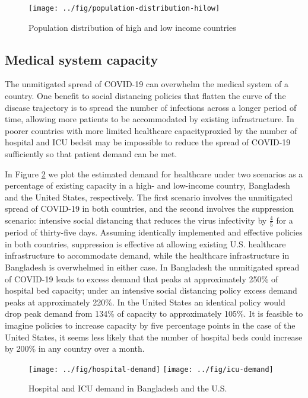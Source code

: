 \documentclass[11pt]{article}
\begin{document}
\begin{figure}
\centering
\caption{Population distribution of high and low income countries}
\texttt{[image: ../fig/population-distribution-hilow]}
\label{fig:pop-dist}
\end{figure}

\subsection{Medical system capacity}

The unmitigated spread of COVID-19 can overwhelm the medical system of a country. One benefit to social distancing policies that flatten the curve of the disease trajectory is to spread the number of infections across a longer period of time, allowing more patients to be accommodated by existing infrastructure. In poorer countries with more limited healthcare capacity\textemdash proxied by the number of hospital and ICU beds\textemdash it may be impossible to reduce the spread of COVID-19 sufficiently so that patient demand can be met.

In Figure \ref{fig:healthcare-demand} we plot the estimated demand for healthcare under two scenarios as a percentage of existing capacity in a high- and low-income country, Bangladesh and the United States, respectively. The first scenario involves the unmitigated spread of COVID-19 in both countries, and the second involves the suppression scenario: intensive social distancing that reduces the virus infectivity by \(\frac{4}{5}\) for a period of thirty-five days. Assuming identically implemented and effective policies in both countries, suppression is effective at allowing existing U.S. healthcare infrastructure to accommodate demand, while the healthcare infrastructure in Bangladesh is overwhelmed in either case. In Bangladesh the unmitigated spread of COVID-19 leads to excess demand that peaks at approximately 250\% of hospital bed capacity; under an intensive social distancing policy excess demand peaks at approximately 220\%. In the United States an identical policy would drop peak demand from 134\% of capacity to approximately 105\%. It is feasible to imagine policies to increase capacity by five percentage points in the case of the United States, it seems less likely that the number of hospital beds could increase by 200\% in any country over a month. 

\begin{figure}
\centering
\caption{Hospital and ICU demand in Bangladesh and the U.S.}
\texttt{[image: ../fig/hospital-demand]}
\texttt{[image: ../fig/icu-demand]}
\label{fig:healthcare-demand}
\end{figure}
\end{document}
